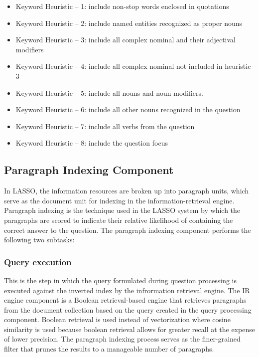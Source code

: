 \begin{itemize}
\item Keyword Heuristic – 1: include non-stop words enclosed in quotations 
\item Keyword Heuristic – 2: include named entities recognized as proper nouns 
\item Keyword Heuristic – 3: include all complex nominal and their adjectival modifiers
\item Keyword Heuristic – 4: include all complex nominal not included in heuristic 3 
\item Keyword Heuristic – 5: include all nouns and noun modifiers.
\item Keyword Heuristic – 6: include all other nouns recognized in the question 
\item Keyword Heuristic – 7: include all verbs from the question
\item Keyword Heuristic – 8: include the question focus 
\end{itemize}

\subsection{Paragraph Indexing Component}

In LASSO, the information resources are broken up into paragraph units, which serve as the document unit for indexing in the information-retrieval engine.  Paragraph indexing is the technique used in the LASSO system by which the paragraphs are scored to indicate their relative likelihood of containing the correct answer to the question.  The paragraph indexing component performs the following two subtasks:

\subsubsection{Query execution}

This is the step in which the query formulated during question processing is executed against the inverted index by the infrormation retrieval engine.  The IR engine component is a Boolean retrieval-based engine that retrieves paragraphs from the document collection based on the query created in the query processing component.  Boolean retrieval is used instead of vectorization where cosine similarity is used because boolean retrieval allows for greater recall at the expense of lower precision.  The paragraph indexing process serves as the finer-grained filter that prunes the results to a manageable number of paragraphs.

